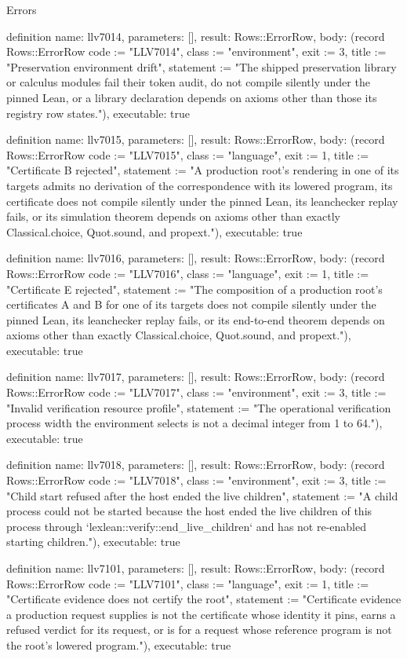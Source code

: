 \begin{lexlean}{Errors}
\begin{semanticmodule}
definition{
  name: llv7014,
  parameters: [],
  result: Rows::ErrorRow,
  body: (record Rows::ErrorRow {code := "LLV7014", class := "environment", exit := 3, title := "Preservation environment drift", statement := "The shipped preservation library or calculus modules fail their token audit, do not compile silently under the pinned Lean, or a library declaration depends on axioms other than those its registry row states."}),
  executable: true
}

definition{
  name: llv7015,
  parameters: [],
  result: Rows::ErrorRow,
  body: (record Rows::ErrorRow {code := "LLV7015", class := "language", exit := 1, title := "Certificate B rejected", statement := "A production root's rendering in one of its targets admits no derivation of the correspondence with its lowered program, its certificate does not compile silently under the pinned Lean, its leanchecker replay fails, or its simulation theorem depends on axioms other than exactly Classical.choice, Quot.sound, and propext."}),
  executable: true
}

definition{
  name: llv7016,
  parameters: [],
  result: Rows::ErrorRow,
  body: (record Rows::ErrorRow {code := "LLV7016", class := "language", exit := 1, title := "Certificate E rejected", statement := "The composition of a production root's certificates A and B for one of its targets does not compile silently under the pinned Lean, its leanchecker replay fails, or its end-to-end theorem depends on axioms other than exactly Classical.choice, Quot.sound, and propext."}),
  executable: true
}

definition{
  name: llv7017,
  parameters: [],
  result: Rows::ErrorRow,
  body: (record Rows::ErrorRow {code := "LLV7017", class := "environment", exit := 3, title := "Invalid verification resource profile", statement := "The operational verification process width the environment selects is not a decimal integer from 1 to 64."}),
  executable: true
}

definition{
  name: llv7018,
  parameters: [],
  result: Rows::ErrorRow,
  body: (record Rows::ErrorRow {code := "LLV7018", class := "environment", exit := 3, title := "Child start refused after the host ended the live children", statement := "A child process could not be started because the host ended the live children of this process through `lexlean::verify::end_live_children` and has not re-enabled starting children."}),
  executable: true
}

definition{
  name: llv7101,
  parameters: [],
  result: Rows::ErrorRow,
  body: (record Rows::ErrorRow {code := "LLV7101", class := "language", exit := 1, title := "Certificate evidence does not certify the root", statement := "Certificate evidence a production request supplies is not the certificate whose identity it pins, earns a refused verdict for its request, or is for a request whose reference program is not the root's lowered program."}),
  executable: true
}


\end{semanticmodule}
\end{lexlean}
